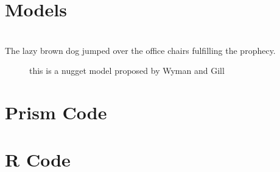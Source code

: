 \documentclass[12pt, titlepage]{article}
\begin{document}

\section{Models}
\blindtext[5]
\\ The lazy brown dog jumped over the office chairs fulfilling the prophecy.\supercite{notides_positive_1981, brandt_cooperativity_1997}

\begin{figure}%
\centering

\caption{this is a nugget model proposed by Wyman and Gill \supercite{wyman_binding_1990}}
\end{figure}

\blindtext[5]

\clearpage
\begin{appendices}
\section{Prism Code}
\blindtext[5]
\section{R Code}
\blindtext[5]
\end{appendices}

\clearpage
\printbibliography
\end{document}

